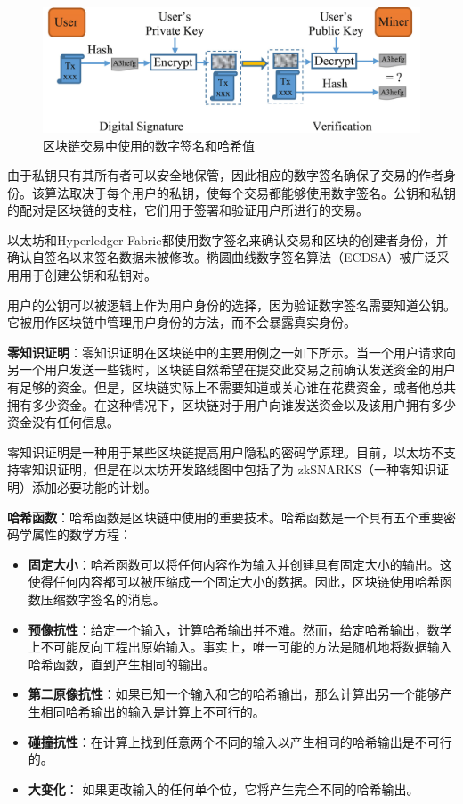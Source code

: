 \begin{translation}
\begin{figure}
	\centering
	\includegraphics[width=\textwidth]{figures/trans2.jpg}
	\caption{区块链交易中使用的数字签名和哈希值}
	\label{fig:区块链交易中使用的数字签名和哈希值}
\end{figure}

由于私钥只有其所有者可以安全地保管，因此相应的数字签名确保了交易的作者身份。该算法取决于每个用户的私钥，使每个交易都能够使用数字签名。公钥和私钥的配对是区块链的支柱，它们用于签署和验证用户所进行的交易。

以太坊和Hyperledger Fabric都使用数字签名来确认交易和区块的创建者身份，并确认自签名以来签名数据未被修改。椭圆曲线数字签名算法（ECDSA）被广泛采用用于创建公钥和私钥对。

用户的公钥可以被逻辑上作为用户身份的选择，因为验证数字签名需要知道公钥。它被用作区块链中管理用户身份的方法，而不会暴露真实身份。

\textbf{零知识证明}：零知识证明在区块链中的主要用例之一如下所示。当一个用户请求向另一个用户发送一些钱时，区块链自然希望在提交此交易之前确认发送资金的用户有足够的资金。但是，区块链实际上不需要知道或关心谁在花费资金，或者他总共拥有多少资金。在这种情况下，区块链对于用户向谁发送资金以及该用户拥有多少资金没有任何信息。

零知识证明是一种用于某些区块链提高用户隐私的密码学原理。目前，以太坊不支持零知识证明，但是在以太坊开发路线图中包括了为 zkSNARKS（一种零知识证明）添加必要功能的计划。

\textbf{哈希函数}：哈希函数是区块链中使用的重要技术。哈希函数是一个具有五个重要密码学属性的数学方程：
\begin{itemize}
    \item \textbf{固定大小}：哈希函数可以将任何内容作为输入并创建具有固定大小的输出。这使得任何内容都可以被压缩成一个固定大小的数据。因此，区块链使用哈希函数压缩数字签名的消息。
    \item \textbf{预像抗性}：给定一个输入，计算哈希输出并不难。然而，给定哈希输出，数学上不可能反向工程出原始输入。事实上，唯一可能的方法是随机地将数据输入哈希函数，直到产生相同的输出。
    \item \textbf{第二原像抗性}：如果已知一个输入和它的哈希输出，那么计算出另一个能够产生相同哈希输出的输入是计算上不可行的。
    \item \textbf{碰撞抗性}：在计算上找到任意两个不同的输入以产生相同的哈希输出是不可行的。
    \item \textbf{大变化}： 如果更改输入的任何单个位，它将产生完全不同的哈希输出。
\end{itemize}


\end{translation}
